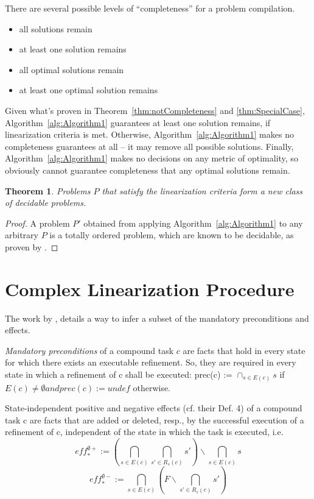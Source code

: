 \documentclass[letterpaper]{article} %
\newtheorem{theorem}{Theorem}
\newcommand{\RelEffPlus} {\ensuremath{\mathit{eff^{\emptyset +}_{*}}}}
\newcommand{\RelEffMinus} {\ensuremath{\mathit{eff^{\emptyset -}_{*}}}}
\begin{document}
There are several possible levels of \enquote{completeness} for a problem compilation.
\begin{itemize}
	\item all solutions remain 
	\item at least one solution remains 
	\item all optimal solutions remain
	\item at least one optimal solution remains 	
\end{itemize}
Given what's proven in Theorem~\ref{thm:notCompleteness} and \ref{thm:SpecialCase}, Algorithm~\ref{alg:Algorithm1} guarantees at least one solution remains, if linearization criteria is met. Otherwise, Algorithm~\ref{alg:Algorithm1} makes no completeness guarantees at all -- it may remove all possible solutions. Finally, Algorithm~\ref{alg:Algorithm1} makes no decisions on any metric of optimality, so obviously cannot guarantee completeness that any optimal solutions remain.


\begin{theorem}\label{thm:newClass}
	Problems $P$ that satisfy the linearization criteria form a new class of decidable problems.
\end{theorem}
\begin{proof}
	A problem $P'$ obtained from applying Algorithm~\ref{alg:Algorithm1} to any arbitrary $P$ is a totally ordered problem, which are known to be decidable, as proven by \cite{Alford2015TightHTNBounds}.  
\end{proof}


\section{Complex Linearization Procedure}

The work by \cite{ConnyPreEff}, details a way to infer a subset of the mandatory preconditions and effects.

\emph{Mandatory preconditions} of a compound task $c$ are facts that hold in every state for which there exists an executable refinement. So, they are required in every state in which a refinement of c shall be executed: prec(c) := $\cap_{s \in E(c)}  s$
if $E(c) \neq \emptyset and prec(c) := undef$ otherwise.

State-independent positive and negative effects (cf. their
Def. 4) of a compound task c are facts that are added or
deleted, resp., by the successful execution of a refinement of
c, independent of the state in which the task is executed, i.e.
$$ \RelEffPlus := ( \bigcap_{s \in E(c)} \bigcap_{s' \in R_s(c)} s') \backslash  \bigcap_{s \in E(c)} s    $$
$$ \RelEffMinus := \bigcap_{s \in E(c)}  (F \backslash \bigcap_{s' \in R_s(c)} s' ) $$
\end{document}
